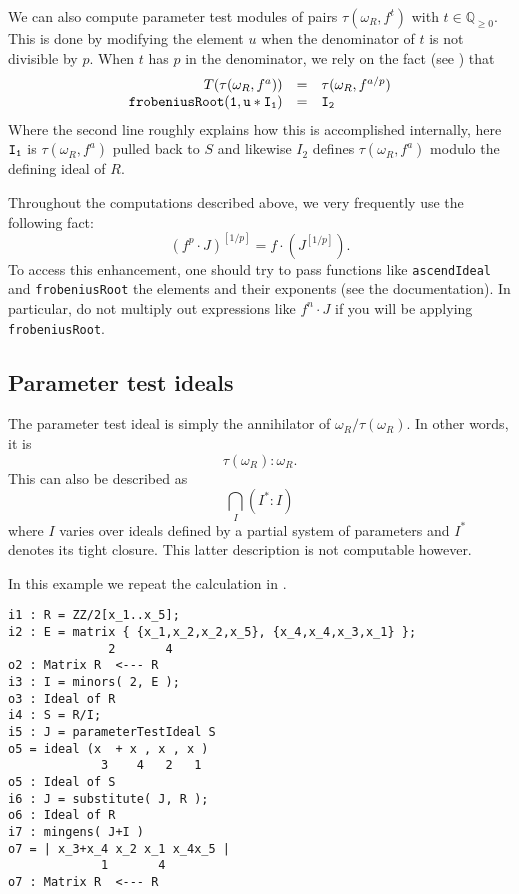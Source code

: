 \documentclass{amsart}
\begin{document}
We can also compute parameter test modules of pairs $\tau(\omega_R, f^{t})$ with $t \in \mathbb{Q}_{\geq 0}$.  This is done by modifying the element $u$ when the denominator of $t$ is not divisible by $p$.  When $t$ has $p$ in the denominator, we rely on the fact (see \cite{BlickleMustataSmithDiscretenessAndRationalityOfFThresholds,SchwedeTuckerTestIdealFiniteMaps}) that
\[
\begin{array}{rcl}
T(\tau(\omega_R, f^a)) & = & \tau(\omega_R, f^{a/p})\\
{\tt frobeniusRoot(1, u*I_1)} & {\tt =} & {\tt I_2}
\end{array}
\]
Where the second line roughly explains how this is accomplished internally, here ${\tt I_1}$ is $\tau(\omega_R, f^a)$ pulled back to $S$ and likewise $I_2$ defines $\tau(\omega_R, f^a)$ modulo the defining ideal of $R$.

\begin{remark}
Throughout the computations described above, we very frequently use the following fact:
\[
(f^p \cdot J)^{[1/p]} = f \cdot (J^{[1/p]}).
\]
To access this enhancement, one should try to pass functions like \texttt{ascendIdeal} and \texttt{frobeniusRoot} the elements and their exponents (see the documentation).  In particular, do not multiply out expressions like $f^n \cdot J$ if you will be applying \texttt{frobeniusRoot}.
\end{remark}

\subsection{Parameter test ideals}

The parameter test ideal is simply the annihilator of $\omega_R/\tau(\omega_R)$.  In other words, it is
\[
\tau(\omega_R) : \omega_R.
\]
This can also be described as
\[
\bigcap_{I} (I^* : I)
\]
where $I$ varies over ideals defined by a partial system of parameters and $I^*$ denotes its tight closure.  This latter description is not computable however.

\begin{example}\label{Example: parameter test ideal}
In this example we repeat the calculation in \cite[\S 9]{KatzmanParameterTestIdealOfCMRings}.

\medskip
\begin{verbatim}
i1 : R = ZZ/2[x_1..x_5];
i2 : E = matrix { {x_1,x_2,x_2,x_5}, {x_4,x_4,x_3,x_1} };
              2       4
o2 : Matrix R  <--- R
i3 : I = minors( 2, E );
o3 : Ideal of R
i4 : S = R/I;
i5 : J = parameterTestIdeal S
o5 = ideal (x  + x , x , x )
             3    4   2   1
o5 : Ideal of S
i6 : J = substitute( J, R );
o6 : Ideal of R
i7 : mingens( J+I )
o7 = | x_3+x_4 x_2 x_1 x_4x_5 |
             1       4
o7 : Matrix R  <--- R
\end{verbatim}
\medskip

\end{example}
\end{document}
